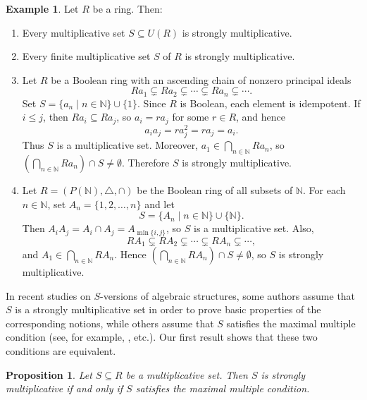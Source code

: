 \documentclass[11pt]{amsart}
\newtheorem{proposition}[theorem]{Proposition}
\theoremstyle{definition}
\newtheorem{example}[theorem]{Example}
\theoremstyle{remark}
\begin{document}
\begin{example}\label{ex1}
Let $R$ be a ring. Then:
\begin{enumerate}
\item Every multiplicative set $S\subseteq U(R)$ is strongly multiplicative.

\item Every finite multiplicative set $S$ of $R$ is strongly multiplicative.

\item Let $R$ be a Boolean ring with an ascending chain of nonzero principal ideals
\[
Ra_1\subsetneq Ra_2\subsetneq \cdots \subsetneq Ra_n\subsetneq\cdots.
\]
Set $S=\{a_n\mid n\in\mathbb{N}\}\cup\{1\}$. Since $R$ is Boolean, each element is idempotent. If $i\le j$, then $Ra_i\subseteq Ra_j$, so $a_i=ra_j$ for some $r\in R$, and hence
\[
a_ia_j=ra_j^2=ra_j=a_i.
\]
Thus $S$ is a multiplicative set. Moreover, $a_1\in\bigcap_{n\in\mathbb{N}} Ra_n$, so $(\bigcap_{n\in\mathbb{N}} Ra_n)\cap S\neq\emptyset$. Therefore $S$ is strongly multiplicative.

\item Let $R=(P(\mathbb{N}),\triangle,\cap)$ be the Boolean ring of all subsets of $\mathbb{N}$. For each $n\in\mathbb{N}$, set $A_n=\{1,2,\ldots,n\}$ and let
\[
S=\{A_n\mid n\in\mathbb{N}\}\cup\{\mathbb{N}\}.
\]
Then $A_iA_j=A_i\cap A_j=A_{\min\{i,j\}}$, so $S$ is a multiplicative set. Also,
\[
RA_1\subsetneq RA_2\subsetneq \cdots \subsetneq RA_n\subsetneq\cdots,
\]
and $A_1\in\bigcap_{n\in\mathbb{N}} RA_n$. Hence $(\bigcap_{n\in\mathbb{N}} RA_n)\cap S\neq\emptyset$, so $S$ is strongly multiplicative.
\end{enumerate}
\end{example}

In recent studies on $S$-versions of algebraic structures, some authors assume that $S$ is a strongly multiplicative set in order to prove basic properties of the corresponding notions, while others assume that $S$ satisfies the maximal multiple condition (see, for example, \cite{Baek, Hamed}, etc.). Our first result shows that these two conditions are equivalent.

\begin{proposition}\label{prop:minimal}
Let $S \subseteq R$ be a multiplicative set. Then $S$ is strongly multiplicative if and only if $S$ satisfies the maximal multiple condition.
\end{proposition}
\end{document}
